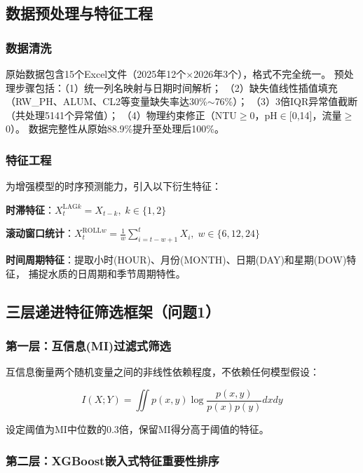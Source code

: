\documentclass[12pt,a4paper]{ctexart}
\begin{document}
\subsection{数据预处理与特征工程}

\subsubsection{数据清洗}

原始数据包含15个Excel文件（2025年12个$\times$2026年3个），格式不完全统一。
预处理步骤包括：（1）统一列名映射与日期时间解析；
（2）缺失值线性插值填充（RW\_PH、ALUM、CL2等变量缺失率达30\%$\sim$76\%）；
（3）3倍IQR异常值截断（共处理5141个异常值）；
（4）物理约束修正（NTU$\geq$0，pH$\in$[0,14]，流量$\geq$0）。
数据完整性从原始88.9\%提升至处理后100\%。

\subsubsection{特征工程}

为增强模型的时序预测能力，引入以下衍生特征：

\textbf{时滞特征}：$X_t^{\mathrm{LAG}k} = X_{t-k},\; k \in \{1, 2\}$

\textbf{滚动窗口统计}：$X_t^{\mathrm{ROLL}w} = \frac{1}{w}\sum_{i=t-w+1}^{t} X_i,\; w \in \{6, 12, 24\}$

\textbf{时间周期特征}：提取小时(HOUR)、月份(MONTH)、日期(DAY)和星期(DOW)特征，
捕捉水质的日周期和季节周期特性。

\subsection{三层递进特征筛选框架（问题1）}

\subsubsection{第一层：互信息(MI)过滤式筛选}

互信息衡量两个随机变量之间的非线性依赖程度，不依赖任何模型假设\cite{ref1}：

\begin{equation}\label{eq:mi}
I(X;Y) = \iint p(x,y) \log\frac{p(x,y)}{p(x)p(y)} dxdy
\end{equation}

设定阈值为MI中位数的0.3倍，保留MI得分高于阈值的特征。

\subsubsection{第二层：XGBoost嵌入式特征重要性排序}
\end{document}
